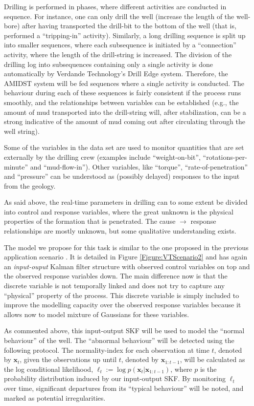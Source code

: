 Drilling is performed in phases, where different activities are conducted in sequence. For instance, one can only drill the well (increase the length of the well-bore) after having transported the drill-bit to the bottom of the well (that is, performed a ``tripping-in'' activity). Similarly, a long drilling sequence is split up into smaller sequences, where each subsequence is initiated by a ``connection'' activity, where the length of the drill-string is increased.
The division of the drilling log into subsequences containing only a single activity is done automatically by Verdande Technology's Drill Edge system. 
Therefore, the AMIDST system will be fed sequences where a single activity is conducted. 
The behaviour during each of these sequences  is fairly consistent if the process runs smoothly, and the relationships between variables can be established (e.g., the amount of mud transported into the drill-string will, after stabilization, can be a strong indicative of the amount of mud coming out after circulating through the well string). 

Some of the variables in the data set are used to monitor quantities that are set externally by the drilling crew (examples include ``weight-on-bit'', ``rotations-per-minute'' and ``mud-flow-in''). Other variables, like ``torque'', ``rate-of-penetration'' and ``pressure'' can be understood as (possibly delayed) responses to the input from the geology. 

As said above, the real-time parameters in drilling can to some extent be divided into control and response variables, where the great unknown is the physical properties of the formation that is penetrated.  The cause $\rightarrow$ response relationships are mostly unknown, but some qualitative understanding exists. 

The model we propose for this task is similar to the one proposed in the previous application scenario . It is detailed in Figure \ref{Figure:VTScenario2} and has again an \emph{input-ouput} Kalman filter structure with observed control variables on top and the observed response variables down. The main difference now is that the discrete variable is not temporally linked and does not try to capture any ``physical'' property of the process. This discrete variable is simply included to improve the modelling capacity over the observed response variables because it allows now to model mixture of Gaussians for these variables. 

As commented above, this input-output SKF  will be used to model the ``normal behaviour'' of the well. The ``abnormal behaviour'' will be detected using the following protocol.  The normality-index for each observation at time $t$, denoted by ${\bm x}_t$, given the observations up until $t$, denoted by ${\bm x}_{1:t-1}$, will be calculated as the log conditional likelihood, $\ell_t := \log p\left({\bm x}_t|{\bm x}_{1:t-1}\right)$, where $p$ is the probability distribution induced by our input-output SKF. By monitoring $\ell_t$ over time, significant departures from its ``typical behaviour'' will be noted, and marked as potential irregularities.


